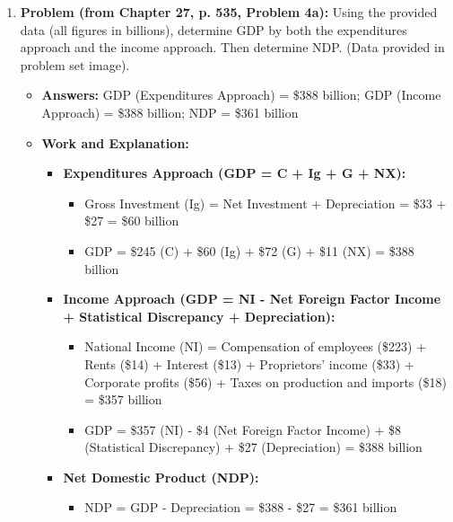 \documentclass{article}
\begin{document}
\begin{enumerate}[label=\arabic*.]
\item \textbf{Problem (from Chapter 27, p. 535, Problem 4a):} Using the provided data (all figures in billions), determine GDP by both the expenditures approach and the income approach. Then determine NDP. (Data provided in problem set image).
\begin{itemize}
\item \textbf{Answers:} GDP (Expenditures Approach) = \$388 billion; GDP (Income Approach) = \$388 billion; NDP = \$361 billion
\item \textbf{Work and Explanation:}
\begin{itemize}
\item \textbf{Expenditures Approach (GDP = C + Ig + G + NX):}
\begin{itemize}
  \item Gross Investment (Ig) = Net Investment + Depreciation = \$33 + \$27 = \$60 billion
  \item GDP = \$245 (C) + \$60 (Ig) + \$72 (G) + \$11 (NX) = \$388 billion
\end{itemize}
\item \textbf{Income Approach (GDP = NI - Net Foreign Factor Income + Statistical Discrepancy + Depreciation):}
\begin{itemize}
  \item National Income (NI) = Compensation of employees (\$223) + Rents (\$14) + Interest (\$13) + Proprietors' income (\$33) + Corporate profits (\$56) + Taxes on production and imports (\$18) = \$357 billion
  \item GDP = \$357 (NI) - \$4 (Net Foreign Factor Income) + \$8 (Statistical Discrepancy) + \$27 (Depreciation) = \$388 billion
\end{itemize}
\item \textbf{Net Domestic Product (NDP):}
\begin{itemize}
  \item NDP = GDP - Depreciation = \$388 - \$27 = \$361 billion
\end{itemize}
\end{itemize}
\end{itemize}


\end{enumerate}
\end{document}
